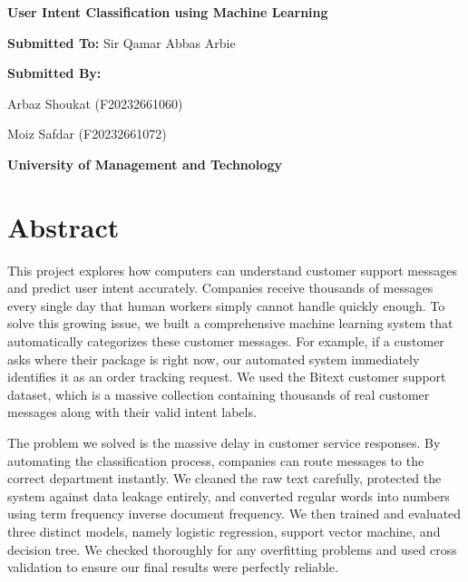 \documentclass[12pt]{article}
\begin{document}
\begin{titlepage}
    \centering
    \vspace*{3cm}
    
    {\Huge \textbf{User Intent Classification using Machine Learning} \par}
    
    \vspace{3cm}
    
    {\Large \textbf{Submitted To:} Sir Qamar Abbas Arbie\par}
    
    \vspace{2cm}
    
    {\Large \textbf{Submitted By:} \par}
    \vspace{0.5cm}
    {\large Arbaz Shoukat (F20232661060) \par}
    {\large Moiz Safdar (F20232661072) \par}
    
    \vfill
    
    {\Large \textbf{University of Management and Technology} \par}
    
    \vspace*{2cm}
\end{titlepage}
\newpage

\tableofcontents
\newpage

\section{Abstract}
This project explores how computers can understand customer support messages and predict user intent accurately. Companies receive thousands of messages every single day that human workers simply cannot handle quickly enough. To solve this growing issue, we built a comprehensive machine learning system that automatically categorizes these customer messages. For example, if a customer asks where their package is right now, our automated system immediately identifies it as an order tracking request. We used the Bitext customer support dataset, which is a massive collection containing thousands of real customer messages along with their valid intent labels. 

The problem we solved is the massive delay in customer service responses. By automating the classification process, companies can route messages to the correct department instantly. We cleaned the raw text carefully, protected the system against data leakage entirely, and converted regular words into numbers using term frequency inverse document frequency. We then trained and evaluated three distinct models, namely logistic regression, support vector machine, and decision tree. We checked thoroughly for any overfitting problems and used cross validation to ensure our final results were perfectly reliable. 
\end{document}
